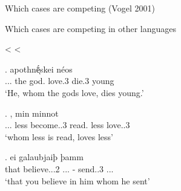 \documentclass[xcolor=dvipsnames,10pt]{beamer}
\begin{document}
\begin{frame}[t]{Which cases are competing (Vogel 2001)}


\end{frame}



\begin{frame}[t]{Which cases are competing in other languages}

\pause

\center
{} <  < 

\pause

\exg.     apothnḗͅskei néos\\
...\textcolor{LimeGreen}{} the god. love.3\textcolor{LimeGreen}{\scsub{[acc]}} die.3\textcolor{Turquoise}{\scsub{[nom]}} young\\
`He, whom the gods love, dies young.' \label{ex:ag-nom-acc}

\pause

\exg.    , min minnot\\
...\textcolor{red}{} less become..3 read.\textcolor{red}{\scsub{[dat]}} less love..3\textcolor{Turquoise}{\scsub{[nom]}}\\
`whom less is read, loves less' \label{ex:ohg-nom-dat}

\pause

\exg. ei galaubjaiþ þamm   \\
that believe...2\textcolor{red}{\scsub{[dat]}} ...\textcolor{red}{} - {send}..3\textcolor{LimeGreen}{\scsub{[acc]}} ...\\
`that you believe in him whom he sent' \label{ex:gothic-dat-acc}

\end{frame}
\end{document}
